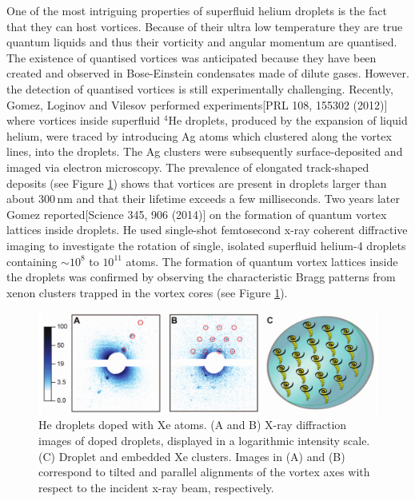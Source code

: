 \documentclass[12pt,a4paper]{book}
\newcommand{\unit}[1]{\,\mathrm{#1}}
\begin{document}
		One of the most intriguing properties of superfluid helium droplets is the fact that they can host vortices. Because of their ultra low temperature they are true quantum liquids and thus their vorticity and angular momentum are quantised. The existence of quantised vortices was anticipated because they have been created and observed in Bose-Einstein condensates made of dilute gases. However. the detection of quantised vortices is still experimentally challenging. Recently, Gomez, Loginov and Vilesov performed experiments[PRL 108, 155302 (2012)] where vortices inside superfluid $^4$He droplets, produced by the expansion of liquid helium, were traced by introducing Ag atoms which clustered along the vortex lines, into the droplets. The Ag clusters were subsequently surface-deposited and imaged via electron microscopy. The prevalence of elongated track-shaped deposits (see Figure \ref{fig:vortex-array}) shows that vortices are present in droplets larger than about $300\unit{nm}$ and that their lifetime exceeds a few milliseconds. Two years later Gomez reported[Science 345, 906 (2014)] on the formation of quantum vortex lattices inside droplets. He used single-shot femtosecond x-ray coherent diffractive imaging to investigate the rotation of single, isolated superfluid helium-4 droplets containing $\sim\!10^8$ to $10^{11}$ atoms. The formation of quantum vortex lattices inside the droplets was confirmed by observing the characteristic Bragg patterns from xenon clusters trapped in the vortex cores (see Figure \ref{fig:vortex-array}).\\

		\begin{figure}[t]
			\begin{center}
				\includegraphics[width=\textwidth]{vortex-array}
			\end{center}
			\caption{He droplets doped with Xe atoms. (A and B) X-ray diffraction images of doped droplets, displayed in a logarithmic intensity scale. (C) Droplet and embedded Xe clusters. Images in (A) and (B) correspond to tilted and parallel alignments of the vortex axes with respect to the incident x-ray beam, respectively.}
			\label{fig:vortex-array}
		\end{figure}
				
\end{document}
